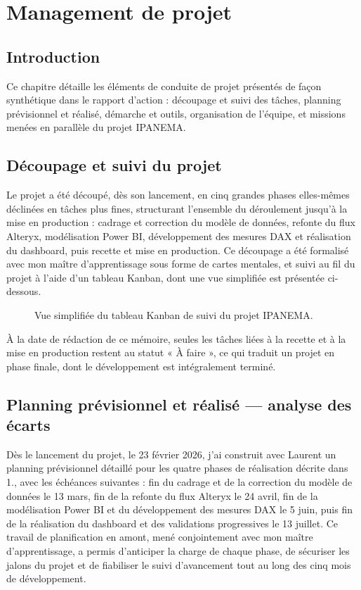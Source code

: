    \chapter{ Management de projet }
 \label{chap3}
 \minitoc
 \section{Introduction}
 \label{sec21}

Ce chapitre détaille les éléments de conduite de projet présentés de façon synthétique 
dans le rapport d'action : découpage et suivi des tâches, planning prévisionnel et réalisé, 
démarche et outils, organisation de l'équipe, et missions menées en parallèle du projet 
IPANEMA.
 
\section{Découpage et suivi du projet}

Le projet a été découpé, dès son lancement, en cinq grandes phases elles-mêmes 
déclinées en tâches plus fines, structurant l'ensemble du déroulement jusqu'à la mise en 
production : cadrage et correction du modèle de données, refonte du flux Alteryx, modélisation 
Power BI, développement des mesures DAX et réalisation du dashboard, puis recette et mise 
en production. Ce découpage a été formalisé avec mon maître d'apprentissage sous forme de 
cartes mentales, et suivi au fil du projet à l'aide d'un tableau Kanban, dont une vue simplifiée 
est présentée ci-dessous.

\begin{figure}
    \centering
    \caption{Vue simplifiée du tableau Kanban de suivi du projet IPANEMA.}
    \label{fig:Vue_simplifiée_du_tableau_Kanban_de_suivi}
\end{figure}

À la date de rédaction de ce mémoire, seules les tâches liées à la recette et à la mise en 
production restent au statut « À faire », ce qui traduit un projet en phase finale, dont le 
développement est intégralement terminé.

\section{Planning prévisionnel et réalisé — analyse des écarts}

Dès le lancement du projet, le 23 février 2026, j'ai construit avec Laurent un planning 
prévisionnel détaillé pour les quatre phases de réalisation décrite dans 1., avec les échéances 
suivantes : fin du cadrage et de la correction du modèle de données le 13 mars, fin de la 
refonte du flux Alteryx le 24 avril, fin de la modélisation Power BI et du développement des 
mesures DAX le 5 juin, puis fin de la réalisation du dashboard et des validations progressives 
le 13 juillet. Ce travail de planification en amont, mené conjointement avec mon maître 
d'apprentissage, a permis d'anticiper la charge de chaque phase, de sécuriser les jalons du 
projet et de fiabiliser le suivi d'avancement tout au long des cinq mois de développement. \\

